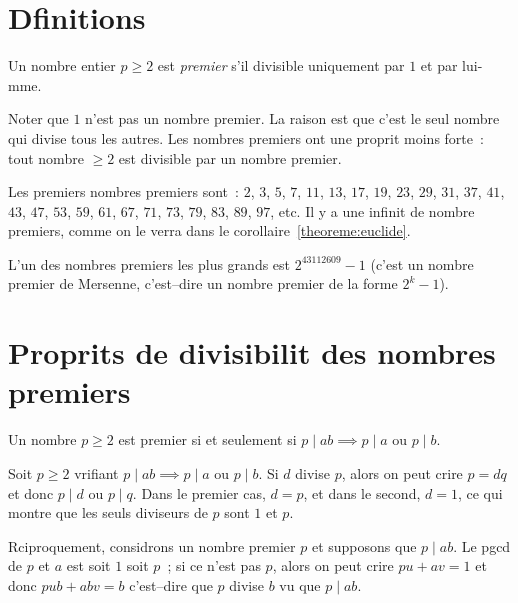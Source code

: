 \documentclass[a4paper,fleqn,openany]{trmbook}
\newcommand*{\definir}[1]{\emph{#1}}
\begin{document}
\section{Dfinitions}

\begin{definition}
Un nombre entier $p \geq 2$ est \definir{premier} s'il divisible uniquement par $1$ et par lui-mme.
\end{definition}

\begin{remarque}
Noter que $1$ n'est pas un nombre premier. La raison est que c'est le seul nombre qui divise tous les autres. Les nombres premiers ont une proprit moins forte~: tout nombre $\geq 2$ est divisible par un nombre premier.
\end{remarque}

\begin{exemples}
\begin{sousexemples}
    \item Les premiers nombres premiers sont~: $2$, $3$, $5$, $7$, $11$, $13$, $17$, $19$, $23$, $29$, $31$, $37$, $41$, $43$, $47$, $53$, $59$, $61$, $67$, $71$, $73$, $79$, $83$, $89$, $97$, etc. Il y a une infinit de nombre premiers, comme on le verra dans le corollaire~\ref{theoreme:euclide}.
    \item L'un des nombres premiers les plus grands est $2^{43112609}-1$ (c'est un nombre premier de Mersenne, c'est--dire un nombre premier de la forme $2^k-1$).
\end{sousexemples}
\end{exemples}

\section{Proprits de divisibilit des nombres premiers}

\begin{lemme}\label{lemme.Gauss}
Un nombre $p \geq 2$ est premier si et seulement si $p \mid ab \implies p \mid a \text{ ou } p \mid b$.
\end{lemme}

\begin{demonstration}
Soit $p \geq 2$ vrifiant $p \mid ab \implies p \mid a \text{ ou } p \mid b$. Si $d$ divise $p$, alors on peut crire $p = dq$ et donc $p \mid d$ ou $p \mid q$. Dans le premier cas, $d = p$, et dans le second, $d = 1$, ce qui montre que les seuls diviseurs de $p$ sont $1$ et $p$.

Rciproquement, considrons un nombre premier $p$ et supposons que $p \mid ab$. Le pgcd de $p$ et $a$ est soit $1$ soit $p$~; si ce n'est pas $p$, alors on peut crire $pu+av=1$ et donc $pub + abv = b$ c'est--dire que $p$ divise $b$ vu que $p \mid ab$.
\end{demonstration}
\end{document}

